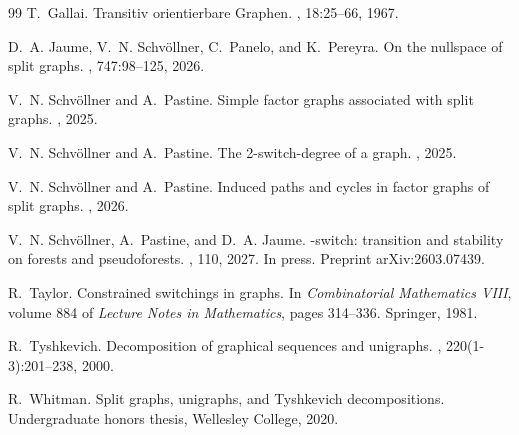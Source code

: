 \documentclass[11pt]{article}
\begin{document}
\begin{thebibliography}{99}
	T.~Gallai.
	\newblock Transitiv orientierbare {G}raphen.
	,
	18:25--66, 1967.
	
	D.~A. Jaume, V.~N. Schv{\"o}llner, C.~Panelo, and K.~Pereyra.
	\newblock On the nullspace of split graphs.
	, 747:98--125, 2026.
	
	
	
	V.~N. Schv{\"o}llner and A.~Pastine.
	\newblock Simple factor graphs associated with split graphs.
	, 2025.
	
	
	V.~N. Schv{\"o}llner and A.~Pastine.
	\newblock The 2-switch-degree of a graph.
	, 2025.
	
	
	V.~N. Schv{\"o}llner and A.~Pastine.
	\newblock Induced paths and cycles in factor graphs of split graphs.
	, 2026.
	
	V.~N. Schv{\"o}llner, A.~Pastine, and D.~A. Jaume.
	-switch: transition and stability on forests and pseudoforests.
		, 110, 2027. In press. Preprint arXiv:2603.07439.
	
	R.~Taylor.
	\newblock Constrained switchings in graphs.
	\newblock In {\em Combinatorial Mathematics VIII}, volume 884 of {\em Lecture
		Notes in Mathematics}, pages 314--336. Springer, 1981.
	
	R.~Tyshkevich.
	\newblock Decomposition of graphical sequences and unigraphs.
	, 220(1-3):201--238, 2000.
	
	R.~Whitman.
	\newblock Split graphs, unigraphs, and {T}yshkevich decompositions.
	\newblock Undergraduate honors thesis, Wellesley College, 2020.
	
\end{thebibliography}
	
%
%	
	
\end{document}

